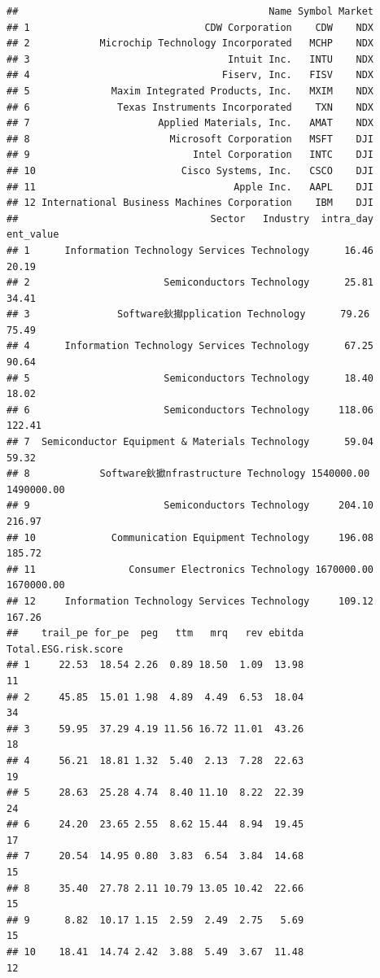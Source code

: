 \documentclass[
]{article}
\begin{document}
\begin{verbatim}
##                                           Name Symbol Market
## 1                              CDW Corporation    CDW    NDX
## 2            Microchip Technology Incorporated   MCHP    NDX
## 3                                  Intuit Inc.   INTU    NDX
## 4                                 Fiserv, Inc.   FISV    NDX
## 5              Maxim Integrated Products, Inc.   MXIM    NDX
## 6               Texas Instruments Incorporated    TXN    NDX
## 7                      Applied Materials, Inc.   AMAT    NDX
## 8                        Microsoft Corporation   MSFT    DJI
## 9                            Intel Corporation   INTC    DJI
## 10                         Cisco Systems, Inc.   CSCO    DJI
## 11                                  Apple Inc.   AAPL    DJI
## 12 International Business Machines Corporation    IBM    DJI
##                                 Sector   Industry  intra_day  ent_value
## 1      Information Technology Services Technology      16.46      20.19
## 2                       Semiconductors Technology      25.81      34.41
## 3               Software鈥擜pplication Technology      79.26      75.49
## 4      Information Technology Services Technology      67.25      90.64
## 5                       Semiconductors Technology      18.40      18.02
## 6                       Semiconductors Technology     118.06     122.41
## 7  Semiconductor Equipment & Materials Technology      59.04      59.32
## 8            Software鈥擨nfrastructure Technology 1540000.00 1490000.00
## 9                       Semiconductors Technology     204.10     216.97
## 10             Communication Equipment Technology     196.08     185.72
## 11                Consumer Electronics Technology 1670000.00 1670000.00
## 12     Information Technology Services Technology     109.12     167.26
##    trail_pe for_pe  peg   ttm   mrq   rev ebitda Total.ESG.risk.score
## 1     22.53  18.54 2.26  0.89 18.50  1.09  13.98                   11
## 2     45.85  15.01 1.98  4.89  4.49  6.53  18.04                   34
## 3     59.95  37.29 4.19 11.56 16.72 11.01  43.26                   18
## 4     56.21  18.81 1.32  5.40  2.13  7.28  22.63                   19
## 5     28.63  25.28 4.74  8.40 11.10  8.22  22.39                   24
## 6     24.20  23.65 2.55  8.62 15.44  8.94  19.45                   17
## 7     20.54  14.95 0.80  3.83  6.54  3.84  14.68                   15
## 8     35.40  27.78 2.11 10.79 13.05 10.42  22.66                   15
## 9      8.82  10.17 1.15  2.59  2.49  2.75   5.69                   15
## 10    18.41  14.74 2.42  3.88  5.49  3.67  11.48                   12

\end{verbatim}
\end{document}
